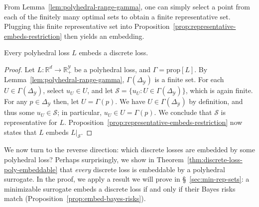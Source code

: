 \documentclass[twoside,11pt]{article}
\newcommand{\reals}{\mathbb{R}}
\newcommand{\prop}[1]{\mathrm{prop}[#1]}
\newcommand{\simplex}{\Delta_\Y}
\newcommand{\Sc}{\mathcal{S}}
\newcommand{\Y}{\mathcal{Y}}
\begin{document}
From Lemma~\ref{lem:polyhedral-range-gamma}, one can simply select a point from each of the finitely many optimal sets to obtain a finite representative set.
Plugging this finite representative set into Proposition~\ref{prop:representative-embeds-restriction} then yields an embedding.


\begin{theorem}\label{thm:poly-embeds-discrete}
  Every polyhedral loss $L$ embeds a discrete loss.
\end{theorem}
\begin{proof}
  Let $L:\reals^d\to\reals_+^\Y$ be a polyhedral loss, and $\Gamma = \prop{L}$.
  By Lemma~\ref{lem:polyhedral-range-gamma}, $\Gamma(\simplex)$ is a finite set. 
  For each $U\in \Gamma(\simplex)$, select $u_U \in U$, and let $\Sc = \{u_U : U \in\Gamma(\simplex)\}$, which is again finite.
  For any $p\in\simplex$ then, let $U = \Gamma(p)$.
  We have $U \in \Gamma(\simplex)$ by definition, and thus some $u_U \in \Sc$; in particular, $u_U \in U = \Gamma(p)$.
  We conclude that $\Sc$ is representative for $L$.
  Proposition~\ref{prop:representative-embeds-restriction} now states that $L$ embeds $L|_\Sc$.
\end{proof}

We now turn to the reverse direction: which discrete losses are embedded by some polyhedral loss?
Perhaps surprisingly, we show in Theorem~\ref{thm:discrete-loss-poly-embeddable} that \emph{every} discrete loss is embeddable by a polyhedral surrogate.
In the proof, we apply a result we will prove in \S~\ref{sec:min-rep-sets}: a minimizable surrogate embeds a discrete loss if and only if their Bayes risks match (Proposition~\ref{prop:embed-bayes-risks}).
\end{document}
